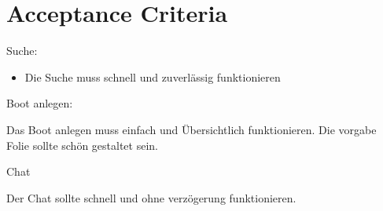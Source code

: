 \documentclass[12pt]{article}
\theoremstyle{definition}
\newenvironment{explanation}{%
   \setlength{\parindent}{0pt}
   \itshape
   \color{blue}
}{}
\begin{document}
\pagebreak
\section{Acceptance Criteria}
\begin{explanation}
Suche:
\begin{itemize}
	\item Die Suche muss schnell und zuverlässig funktionieren
\end{itemize}
Boot anlegen:
\begin{itemize}
	Das Boot anlegen muss einfach und Übersichtlich funktionieren. Die vorgabe Folie sollte schön gestaltet sein.
\end{itemize}
Chat
\begin{itemize}
	Der Chat sollte schnell und ohne verzögerung funktionieren.
\end{itemize}
\end{explanation}
\end{document}
